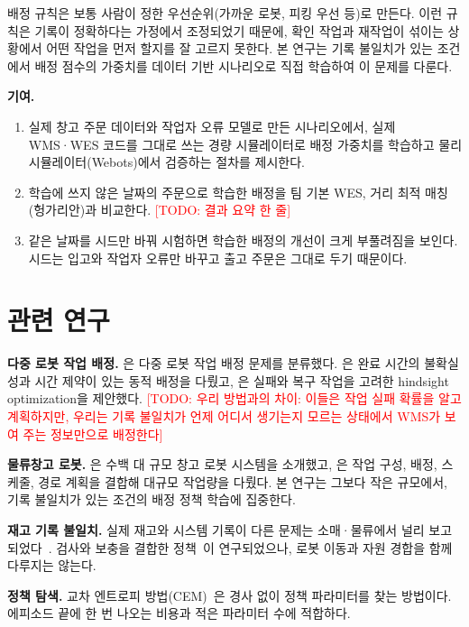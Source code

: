 \documentclass[conference]{IEEEtran}
\newcommand{\todo}[1]{\textcolor{red}{[TODO: #1]}}
\begin{document}
배정 규칙은 보통 사람이 정한 우선순위(가까운 로봇, 피킹 우선 등)로 만든다.
이런 규칙은 기록이 정확하다는 가정에서 조정되었기 때문에, 확인 작업과 재작업이 섞이는 상황에서 어떤 작업을 먼저 할지를 잘 고르지 못한다.
본 연구는 기록 불일치가 있는 조건에서 배정 점수의 가중치를 데이터 기반 시나리오로 직접 학습하여 이 문제를 다룬다.

\textbf{기여.}
\begin{enumerate}
  \item 실제 창고 주문 데이터와 작업자 오류 모델로 만든 시나리오에서, 실제 WMS·WES 코드를 그대로 쓰는 경량 시뮬레이터로 배정 가중치를 학습하고 물리 시뮬레이터(Webots)에서 검증하는 절차를 제시한다.
  \item 학습에 쓰지 않은 날짜의 주문으로 학습한 배정을 팀 기본 WES, 거리 최적 매칭(헝가리안)과 비교한다. \todo{결과 요약 한 줄}
  \item 같은 날짜를 시드만 바꿔 시험하면 학습한 배정의 개선이 크게 부풀려짐을 보인다. 시드는 입고와 작업자 오류만 바꾸고 출고 주문은 그대로 두기 때문이다.
\end{enumerate}

\section{관련 연구}

\textbf{다중 로봇 작업 배정.}
\citet{gerkey2004}은 다중 로봇 작업 배정 문제를 분류했다.
\citet{choudhury2020}은 완료 시간의 불확실성과 시간 제약이 있는 동적 배정을 다뤘고,
\citet{dhanaraj2024}은 실패와 복구 작업을 고려한 hindsight optimization을 제안했다.
\todo{우리 방법과의 차이: 이들은 작업 실패 확률을 알고 계획하지만, 우리는 기록 불일치가 언제 어디서 생기는지 모르는 상태에서 WMS가 보여 주는 정보만으로 배정한다}

\textbf{물류창고 로봇.}
\citet{wurman2008}은 수백 대 규모 창고 로봇 시스템을 소개했고,
\citet{leet2023}은 작업 구성, 배정, 스케줄, 경로 계획을 결합해 대규모 작업량을 다뤘다.
본 연구는 그보다 작은 규모에서, 기록 불일치가 있는 조건의 배정 정책 학습에 집중한다.

\textbf{재고 기록 불일치.}
실제 재고와 시스템 기록이 다른 문제는 소매·물류에서 널리 보고되었다~\cite{dehoratius2008}.
검사와 보충을 결합한 정책~\cite{kok2007,akkerman2025}이 연구되었으나, 로봇 이동과 자원 경합을 함께 다루지는 않는다.

\textbf{정책 탐색.}
교차 엔트로피 방법(CEM)~\cite{rubinstein1999}은 경사 없이 정책 파라미터를 찾는 방법이다.
에피소드 끝에 한 번 나오는 비용과 적은 파라미터 수에 적합하다.
\end{document}
